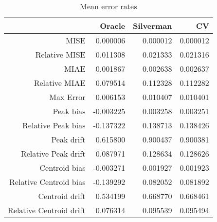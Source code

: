 \begin{table}[ht]
\centering
\begin{tabular}{rrrr}
  \hline
 & Oracle & Silverman & CV \\ 
  \hline
MISE & 0.000006 & 0.000012 & 0.000012 \\ 
  Relative MISE & 0.011308 & 0.021333 & 0.021316 \\ 
  MIAE & 0.001867 & 0.002638 & 0.002637 \\ 
  Relative MIAE & 0.079514 & 0.112328 & 0.112282 \\ 
  Max Error & 0.006153 & 0.010407 & 0.010401 \\ 
  Peak bias & -0.003225 & 0.003258 & 0.003251 \\ 
  Relative Peak bias & -0.137322 & 0.138713 & 0.138426 \\ 
  Peak drift & 0.615800 & 0.900437 & 0.900381 \\ 
  Relative Peak drift & 0.087971 & 0.128634 & 0.128626 \\ 
  Centroid bias & -0.003271 & 0.001927 & 0.001923 \\ 
  Relative Centroid bias & -0.139292 & 0.082052 & 0.081892 \\ 
  Centroid drift & 0.534199 & 0.668770 & 0.668461 \\ 
  Relative Centroid drift & 0.076314 & 0.095539 & 0.095494 \\ 
   \hline
\end{tabular}
\caption{Mean error rates} 
\label{tbl:mean_error_rates}
\end{table}
